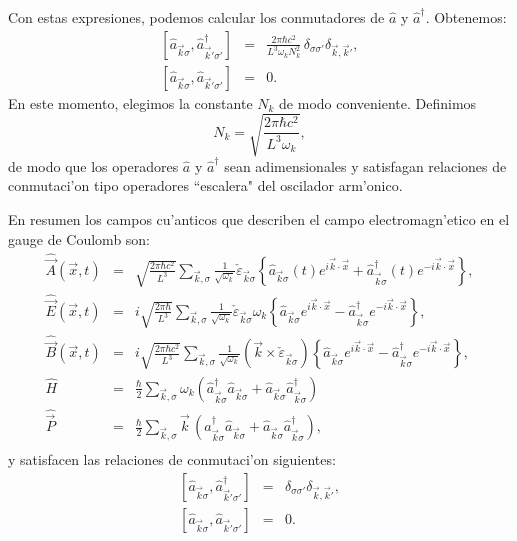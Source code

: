Con estas expresiones, podemos calcular los conmutadores de $\hat{a}$ y
$\hat{a}^\dagger$. Obtenemos:
\begin{eqnarray}
\left[ \hat{a}_{\vec{k}\sigma},\hat{a}_{\vec{k}'\sigma '}^{\dagger}\right]
&=&\frac{2\pi\hbar c^2}{L^3\omega_kN_k^2}\,\delta_{\sigma\sigma
'}\delta_{\vec{k},\vec{k}'}  , \label{aad}\\
\left[ \hat{a}_{\vec{k}\sigma},\hat{a}_{\vec{k}'\sigma '}\right] &=&0. 
\end{eqnarray}
En este momento, elegimos la constante $N_k$ de modo conveniente. Definimos
\begin{equation}
N_k=\sqrt{\frac{2\pi\hbar c^2}{L^3\omega_k}},
\end{equation} 
de modo que los operadores $\hat{a}$ y $\hat{a}^\dagger$ sean adimensionales y
satisfagan relaciones de conmutaci'on tipo operadores ``escalera" del oscilador
arm'onico.

En resumen los campos cu'anticos que describen el campo electromagn'etico en el
gauge de Coulomb son:
\begin{eqnarray}
\hat{\vec{A}}(\vec{x},t)  &=& \sqrt{\frac{2\pi\hbar
c^2}{L^3}}\sum_{\vec{k},\sigma}\frac{1}{\sqrt{\omega_k}}\check{\varepsilon}_{
\vec{k}\sigma}\left\{
\hat{a}_{\vec{k}\sigma}(t)e^{i\vec{k}\cdot\vec{x}}+\hat{a}_{\vec{k}\sigma}
^\dagger (t)e^{-i\vec{k}\cdot\vec{x}}\right\} , \label{Afi}\\
\hat{\vec{E}}(\vec{x},t)  & =
&i\sqrt{\frac{2\pi\hbar}{L^3}}\sum_{\vec{k},\sigma}\frac{1}{\sqrt{\omega_k}}
\check{\varepsilon}_{\vec{k}\sigma}\omega_{k}\left\{
\hat{a}_{\vec{k}\sigma}e^{i\vec{k}\cdot\vec{x}}-\hat{a}_{\vec{k}\sigma}^\dagger
e^{-i\vec{k}\cdot\vec{x}}\right\}, \\
\hat{\vec{B}}(\vec{x},t) & = &i\sqrt{\frac{2\pi\hbar
c^2}{L^3}}\sum_{\vec{k},\sigma}\frac{1}{\sqrt{\omega_k}}\left(
\vec{k}\times\check{\varepsilon}_{\vec{k}\sigma}\right) \left\{
\hat{a}_{\vec{k}\sigma}e^{i\vec{k}\cdot\vec{x}}-\hat{a}_{\vec{k}\sigma}^\dagger
e^{-i\vec{k}\cdot\vec{x}}\right\} ,\\
\hat{H} & = &\frac{\hbar}{2}\sum_{\vec{k},\sigma}\omega_k\left(
\hat{a}_{\vec{k}\sigma}^\dagger \hat{a}_{\vec{k}\sigma}+ \hat{a}_{\vec{k}\sigma}
\hat{a}_{\vec{k}\sigma}^\dagger\right)  \\
\hat{\vec{P}} & = &\frac{\hbar}{2}\sum_{\vec{k},\sigma}\vec{k}\,\left(
\hat{a}_{\vec{k}\sigma}^\dagger \hat{a}_{\vec{k}\sigma}+ \hat{a}_{\vec{k}\sigma}
\hat{a}_{\vec{k}\sigma}^\dagger\right) ,\\
\end{eqnarray}
y satisfacen las relaciones de conmutaci'on siguientes:
\begin{eqnarray}
\left[ \hat{a}_{\vec{k}\sigma},\hat{a}_{\vec{k}'\sigma '}^{\dagger}\right]
&=&\delta_{\sigma\sigma'}\delta_{\vec{k},\vec{k}'}  , \label{aadf}\\
\left[ \hat{a}_{\vec{k}\sigma},\hat{a}_{\vec{k}'\sigma '}\right] &=&0.
\label{aadf2}
\end{eqnarray}


